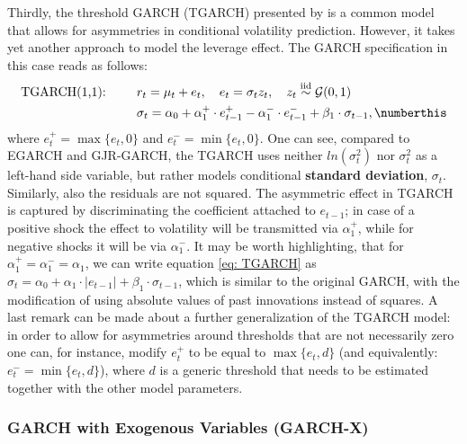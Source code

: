 Thirdly, the threshold GARCH (TGARCH) presented by \textcite{Zakoian1994} is a common model that allows for asymmetries in conditional volatility prediction. However, it takes yet another approach to model the leverage effect. The GARCH specification in this case reads as follows:
\begin{align*}
\text{TGARCH(1,1): }\qquad &  r_t = \mu_{t} + e_{t}, \quad e_{t} = \sigma_{t} z_{t},\quad  z_{t} \overset{\text{iid}}{\sim} \mathcal{G}(0,1) \\
& \sigma_t = \alpha_0 + \alpha_{1}^+ \cdot e_{t-1}^+  - \alpha_{1}^- \cdot e_{t-1}^- + \beta_1 \cdot \sigma_{t-1}, \numberthis \label{eq: TGARCH}
\end{align*} 
where $e_{t}^+ = \max \{e_{t}, 0\}$ and $e_{t}^- = \min \{e_{t}, 0\}$.  One can see, compared to EGARCH and GJR-GARCH, the TGARCH uses neither $ln(\sigma_t^2)$ nor $\sigma_t^2$ as a left-hand side variable, but rather models conditional \textbf{standard deviation}, $\sigma_t$. Similarly, also the residuals are not squared.
The asymmetric effect in TGARCH is captured by discriminating the coefficient attached to $e_{t-1}$; in case of a positive shock the effect to volatility will be transmitted via $\alpha_{1}^+$, while for negative shocks it will be via $\alpha_{1}^-$. It may be worth highlighting, that for $\alpha_{1}^+ = \alpha_{1}^- = \alpha_{1}$, we can write equation \eqref{eq: TGARCH} as $\sigma_t = \alpha_0 + \alpha_{1} \cdot |e_{t-1}| + \beta_1 \cdot \sigma_{t-1}$, which is similar to the original GARCH, with the modification of using absolute values of past innovations instead of squares. A last remark can be made about a further generalization of the TGARCH model: in order to allow for asymmetries around thresholds that are not necessarily zero one can, for instance, modify $e_{t}^+$ to be equal to $\max \{e_{t}, d\}$ (and equivalently:  $e_{t}^- = \min \{e_{t}, d\}$), where $d$ is a generic threshold that needs to be estimated together with the other model parameters.


\subsubsection{GARCH with Exogenous Variables (GARCH-X)}
\label{sssec: lit_rev_vola_GARCHX}

